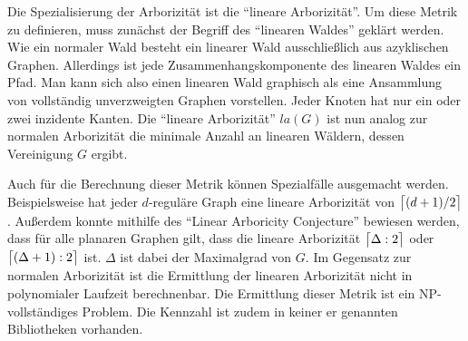 \documentclass[a4paper,12pt,ngerman,chapterprefix=false,listof=totoc,bibliography=totoc]{scrreprt}
\DeclarePairedDelimiter{\ceil}{\lceil}{\rceil}
\begin{document}
{Die Spezialisierung der Arborizität ist die "`lineare Arborizität"'. Um diese Metrik zu definieren, muss zunächst der Begriff des "`linearen Waldes"' geklärt werden. Wie ein normaler Wald besteht ein linearer Wald ausschließlich aus azyklischen Graphen. Allerdings ist jede Zusammenhangskomponente des linearen Waldes ein Pfad. Man kann sich also einen linearen Wald graphisch als eine Ansammlung von vollständig unverzweigten Graphen vorstellen. Jeder Knoten hat nur ein oder zwei inzidente Kanten. Die "`lineare Arborizität"' \(la(G)\) ist nun analog zur normalen Arborizität die minimale Anzahl an linearen Wäldern, dessen Vereinigung \(G\) ergibt. \cite{alon_linear_1988}

Auch für die Berechnung dieser Metrik können Spezialfälle ausgemacht werden. Beispielsweise hat jeder \(d\)-reguläre Graph eine lineare Arborizität von \(\ceil[\big]{(d+1)/2}\). Außerdem konnte mithilfe des "`Linear Arboricity Conjecture"' bewiesen werden, dass für alle planaren Graphen gilt, dass die lineare Arborizität \(\ceil[\big]{\Delta :2}\) oder \(\ceil[\big]{(\Delta +1):2}\) ist. \(\Delta\) ist dabei der Maximalgrad von \(G\). Im Gegensatz zur normalen Arborizität ist die Ermittlung der linearen Arborizität nicht in polynomialer Laufzeit berechnenbar. Die Ermittlung dieser Metrik ist ein NP-vollständiges Problem. Die Kennzahl ist zudem in keiner er genannten Bibliotheken vorhanden. \cite{peroche_np-completeness_1984,calamoneri_planar_2010}
}
\end{document}
